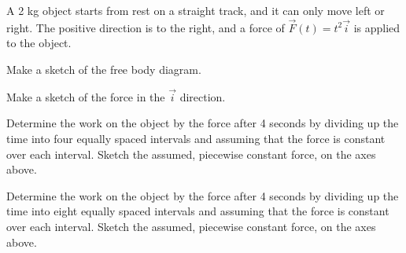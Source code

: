 \begin{problem}
  \clearpage

\item A 2 kg object starts from rest on a straight track, and it can
  only move left or right. The positive direction is to the right, and
  a force of $\vec{F}(t)=t^2 \vec{i}$ is applied to the object.

  \begin{subproblem}
    \item Make a sketch of the free body diagram.
      \vspace{4em}
    \item Make a sketch of the force in the $\vec{i}$ direction. \\
      \scalebox{0.5}{}
    \item Determine the work on the object by the force after 4
      seconds by dividing up the time into four equally spaced
      intervals and assuming that the force is constant over each
      interval. Sketch the assumed, piecewise constant force, on the
      axes above.
      \vfill
    \item Determine the work on the object by the force after 4
      seconds by dividing up the time into eight equally spaced
      intervals and assuming that the force is constant over each
      interval. Sketch the assumed, piecewise constant force, on the
      axes above.
      \vfill
  \end{subproblem}

\end{problem}



